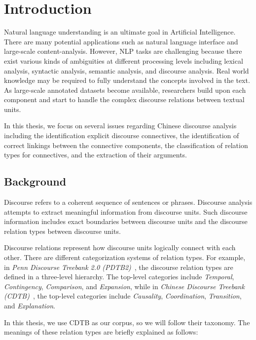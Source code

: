 %
%
%
\chapter{Introduction}
\label{c:intro}

Natural language understanding is an ultimate goal in Artificial
Intelligence. There are many potential applications such as natural language
interface and large-scale content-analysis. However, NLP tasks are
challenging because there exist various kinds of ambiguities at different processing levels
including lexical analysis, syntactic analysis, semantic analysis, and discourse analysis.
Real world knowledge may be required to fully understand the concepts involved in the text.
As large-scale annotated datasets become available, researchers build upon each
component and start to handle the complex discourse relations between textual units.

In this thesis, we focus on several issues regarding Chinese discourse analysis
including the identification explicit discourse connectives,
the identification of correct linkings between the connective components,
the classification of relation types for connectives,
and the extraction of their arguments.

%
%
\section{Background}

Discourse refers to a coherent sequence of sentences or phrases.
Discourse analysis attempts to extract meaningful information from
discourse units. Such discourse information includes exact boundaries
between discourse units and the discourse relation types between
discourse units.

Discourse relations represent how discourse units logically connect
with each other. There are different categorization systems of relation types.
For example, in
\textit{Penn Discourse Treebank 2.0 (PDTB2)}~\citep{Prasad08thepenn}, the discourse
relation types are defined in a three-level hierarchy. The top-level categories
include \textit{Temporal}, \textit{Contingency}, \textit{Comparison},
and \textit{Expansion}, while in
\textit{Chinese Discourse Treebank (CDTB)}~\citep{li2014building},
the top-level categories include \textit{Causality}, \textit{Coordination},
\textit{Transition}, and \textit{Explanation}.

In this thesis, we use CDTB as our corpus, so we will follow their taxonomy.
The meanings of these relation types are briefly explained as follows:

